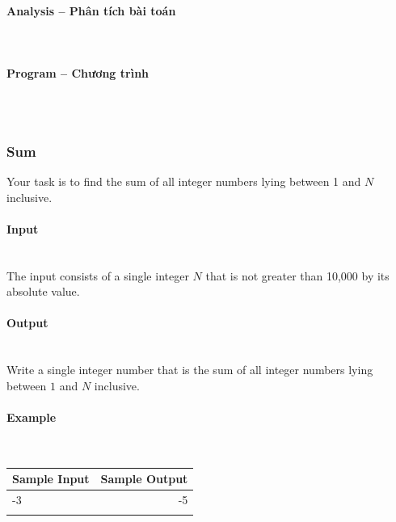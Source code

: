 \documentclass{article}
\begin{document}
\paragraph{Analysis -- Phân tích bài toán} \mbox{} \\


\paragraph{Program -- Chương trình} \mbox{} \\


\begin{lstlisting}

\end{lstlisting}




\subsubsection{Sum}

Your task is to find the sum of all integer numbers lying between 1 and $N$ inclusive.

\paragraph{Input} \mbox{} \\

The input consists of a single integer $N$ that is not greater than 10,000 by its absolute value.

\paragraph{Output}\mbox{} \\

Write a single integer number that is the sum of all integer numbers lying between $1$ and $N$ inclusive.

\paragraph{Example}\mbox{} \\

\begin{table}[h]
    \centering
    \begin{tabular}{|l|r|}
        \hline
        \textbf{Sample Input} & \textbf{Sample Output} \\
        \hline
        -3 & -5  \\ 
            &  \\ \hline
    \end{tabular}
\end{table}
\end{document}
